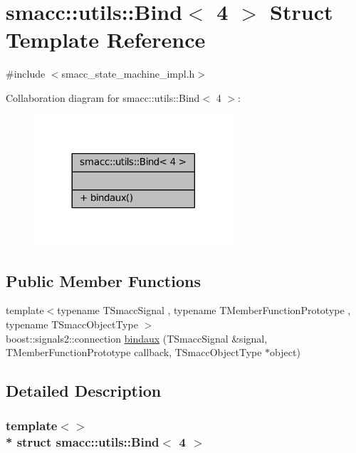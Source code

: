 \hypertarget{structsmacc_1_1utils_1_1Bind_3_014_01_4}{}\section{smacc\+:\+:utils\+:\+:Bind$<$ 4 $>$ Struct Template Reference}
\label{structsmacc_1_1utils_1_1Bind_3_014_01_4}


{\ttfamily \#include $<$smacc\+\_\+state\+\_\+machine\+\_\+impl.\+h$>$}



Collaboration diagram for smacc\+:\+:utils\+:\+:Bind$<$ 4 $>$\+:
\nopagebreak
\begin{figure}[H]
\begin{center}
\leavevmode
\includegraphics[width=209pt]{structsmacc_1_1utils_1_1Bind_3_014_01_4__coll__graph}
\end{center}
\end{figure}
\subsection*{Public Member Functions}
\begin{DoxyCompactItemize}
\item 
{\footnotesize template$<$typename T\+Smacc\+Signal , typename T\+Member\+Function\+Prototype , typename T\+Smacc\+Object\+Type $>$ }\\boost\+::signals2\+::connection \hyperlink{structsmacc_1_1utils_1_1Bind_3_014_01_4_af999b2ea156fad369be761be47f83f18}{bindaux} (T\+Smacc\+Signal \&signal, T\+Member\+Function\+Prototype callback, T\+Smacc\+Object\+Type $\ast$object)
\end{DoxyCompactItemize}


\subsection{Detailed Description}
\subsubsection*{template$<$$>$\\*
struct smacc\+::utils\+::\+Bind$<$ 4 $>$}



